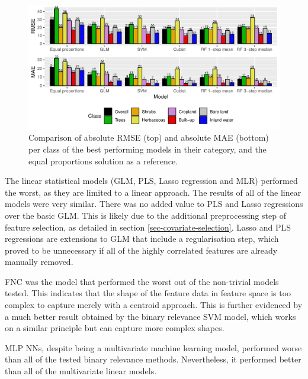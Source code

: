 \documentclass[review,authoryear,3p]{elsarticle}
\begin{document}
\begin{figure}
    \includegraphics[width=\textwidth]{article-figures/barplots/2020-06-03-model-comparison-bar}
    \caption{Comparison of absolute \gls{RMSE} (top) and absolute \gls{MAE} (bottom) per class of the best performing models in their category, and the equal proportions solution as a reference.}
    \label{fig-models}
\end{figure}

The linear statistical models (\gls{GLM}, \gls{PLS}, Lasso regression and \gls{MLR}) performed the worst, as they are limited to a linear approach.
The results of all of the linear models were very similar.
There was no added value to \gls{PLS} and Lasso regressions over the basic \gls{GLM}.
This is likely due to the additional preprocessing step of feature selection, as detailed in section \ref{sec-covariate-selection}.
Lasso and \gls{PLS} regressions are extensions to \gls{GLM} that include a regularisation step, which proved to be unnecessary if all of the highly correlated features are already manually removed.

\Gls{FNC} was the model that performed the worst out of the non-trivial models tested.
This indicates that the shape of the feature data in feature space is too complex to capture merely with a centroid approach.
This is further evidenced by a much better result obtained by the binary relevance \gls{SVM} model, which works on a similar principle but can capture more complex shapes.

\Gls{MLP} \glspl{NN}, despite being a multivariate machine learning model, performed worse than all of the tested binary relevance methods.
Nevertheless, it performed better than all of the multivariate linear models.

\end{document}
